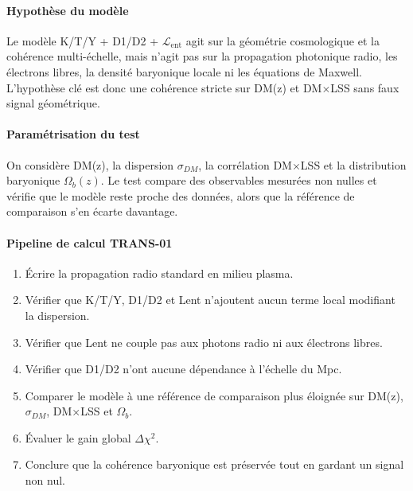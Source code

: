 \documentclass[11pt,a4paper]{article}
\newcommand{\Lent}{\mathcal{L}_{\mathrm{ent}}}
\begin{document}
\paragraph{Hypothèse du modèle}
Le modèle K/T/Y + D1/D2 + $\Lent$ agit sur la géométrie cosmologique et la cohérence multi-échelle, mais n'agit pas sur la propagation photonique radio, les électrons libres, la densité baryonique locale ni les équations de Maxwell. L'hypothèse clé est donc une cohérence stricte sur DM(z) et DM$\times$LSS sans faux signal géométrique.

\paragraph{Paramétrisation du test}
On considère DM(z), la dispersion $\sigma_{DM}$, la corrélation DM$\times$LSS et la distribution baryonique $\Omega_b(z)$. Le test compare des observables mesurées non nulles et vérifie que le modèle reste proche des données, alors que la référence de comparaison s'en écarte davantage.

\paragraph{Pipeline de calcul TRANS-01}
\begin{enumerate}[leftmargin=*,itemsep=0.2em,topsep=0.2em]
\item Écrire la propagation radio standard en milieu plasma.
\item Vérifier que K/T/Y, D1/D2 et Lent n'ajoutent aucun terme local modifiant la dispersion.
\item Vérifier que Lent ne couple pas aux photons radio ni aux électrons libres.
\item Vérifier que D1/D2 n'ont aucune dépendance à l'échelle du Mpc.
\item Comparer le modèle à une référence de comparaison plus éloignée sur DM(z), $\sigma_{DM}$, DM$\times$LSS et $\Omega_b$.
\item Évaluer le gain global $\Delta\chi^2$.
\item Conclure que la cohérence baryonique est préservée tout en gardant un signal non nul.
\end{enumerate}
\end{document}
